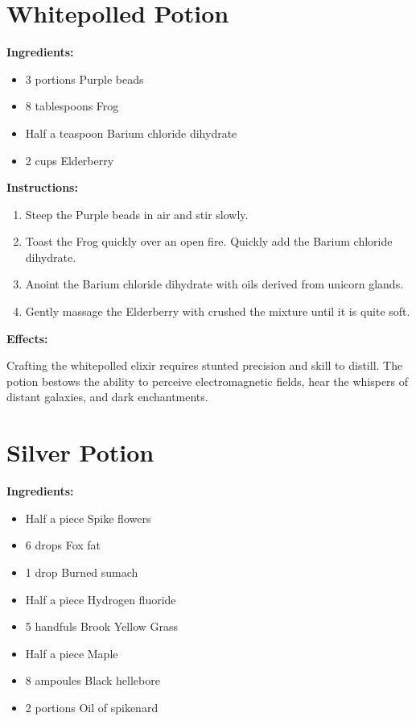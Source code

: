 \documentclass{article}
\begin{document}
\newpage
\section*{Whitepolled Potion}

\textbf{Ingredients:}

\begin{itemize}
  \item 3 portions Purple beads
  \item 8 tablespoons Frog
  \item Half a teaspoon Barium chloride dihydrate
  \item 2 cups Elderberry
\end{itemize}

\textbf{Instructions:}

\begin{enumerate}
  \item Steep the Purple beads in air and stir slowly.
  \item Toast the Frog quickly over an open fire. Quickly add the Barium chloride dihydrate.
  \item Anoint the Barium chloride dihydrate with oils derived from unicorn glands.
  \item Gently massage the Elderberry with crushed the mixture until it is quite soft.
\end{enumerate}

\textbf{Effects:}

Crafting the whitepolled elixir requires stunted precision and skill to distill. The potion bestows the ability to perceive electromagnetic fields, hear the whispers of distant galaxies, and dark enchantments.

\newpage
\section*{Silver Potion}

\textbf{Ingredients:}

\begin{itemize}
  \item Half a piece Spike flowers
  \item 6 drops Fox fat
  \item 1 drop Burned sumach
  \item Half a piece Hydrogen fluoride
  \item 5 handfuls Brook Yellow Grass
  \item Half a piece Maple
  \item 8 ampoules Black hellebore
  \item 2 portions Oil of spikenard
\end{itemize}
\end{document}
